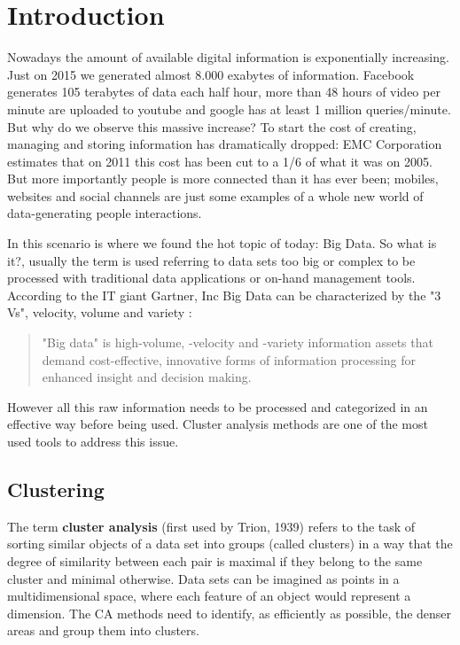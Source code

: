 \chapter{Introduction}

Nowadays the amount of available digital information is exponentially increasing. Just on 2015 we generated almost 8.000 exabytes of information. Facebook generates 105 terabytes of data each half hour, more than 48 hours of video per minute are uploaded to youtube and google has at least 1 million queries/minute. But why do we observe this massive increase? To start the cost of creating, managing and storing information has dramatically dropped: EMC Corporation estimates that on 2011 this cost has been cut to a 1/6 of what it was on 2005. But more importantly people is more connected than it has ever been; mobiles, websites and social channels are just some examples of a whole new world of data-generating people interactions. 

In this scenario is where we found the hot topic of today: Big Data. So what is it?, usually the term is used referring to data sets too big or complex to be processed with traditional data applications or on-hand management tools. According to the IT giant Gartner, Inc Big Data can be characterized by the "3 Vs", velocity, volume and variety \cite{Laney}:

\begin{quotation}
"Big data" is high-volume, -velocity and -variety information assets that demand cost-effective, innovative forms of information processing for enhanced insight and decision making.
\end{quotation}


However all this raw information needs to be processed and categorized in an effective way before being used. Cluster analysis methods are one of the most used tools to address this issue. 

\section{Clustering}

The term \textbf{cluster analysis} (first used by Trion, 1939) refers to the task of sorting similar objects of a data set into groups (called clusters) in a way that the degree of similarity between each pair is maximal if they belong to the same cluster and minimal otherwise. Data sets can be imagined as points in a multidimensional space, where each feature of an object would represent a dimension. The CA methods need to identify, as efficiently as possible, the denser areas and group them into clusters.

